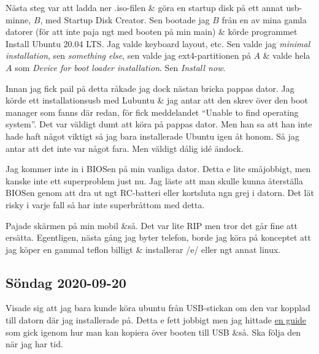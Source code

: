Nästa steg var att ladda ner .iso-filen \& göra en startup disk på ett annat usb-minne, $B$, med Startup Disk Creator. Sen bootade jag $B$ från en av mina gamla datorer (för att inte paja ngt med booten på min main) \& körde programmet Install Ubuntu 20.04 LTS. Jag valde keyboard layout, etc. Sen valde jag \emph{minimal installation}, sen \emph{something else}, sen valde jag ext4-partitionen på $A$ \& valde hela $A$ som \emph{Device for boot loader installation}. Sen \emph{Install now}.

Innan jag fick pail på detta råkade jag dock nästan bricka pappas dator. Jag körde ett installationsusb med Lubuntu \& jag antar att den skrev över den boot manager som fanns där redan, för fick meddelandet \enquote{Unable to find operating system}. Det var väldigt dumt att köra på pappas dator. Men han sa att han inte hade haft något viktigt så jag bara installerade Ubuntu igen åt honom. Så jag antar att det inte var något fara. Men väldigt dålig idé ändock.

Jag kommer inte in i BIOSen på min vanliga dator. Detta e lite småjobbigt, men kanske inte ett superproblem just nu. Jag läste att man skulle kunna återställa BIOSen genom att dra ut ngt RC-batteri eller kortsluta ngn grej i datorn. Det lät risky i varje fall så har inte superbråttom med detta.

\bigskip

Pajade skärmen på min mobil \&så. Det var lite RIP men tror det går fine att ersätta. Egentligen, nästa gång jag byter telefon, borde jag köra på konceptet att jag köper en gammal teflon billigt \& installerar /e/ eller ngt annat linux.

\subsection{Söndag 2020-09-20}

Visade sig att jag bara kunde köra ubuntu från USB-stickan om den var kopplad till datorn där jag installerade på. Detta e fett jobbigt men jag hittade \href{https://meaningofstuff.blogspot.com/2019/09/linux-ubuntu-1904-full-install-on-usb.html}{\color{blue}en guide} som gick igenom hur man kan kopiera över booten till USB \&så. Ska följa den när jag har tid. 
